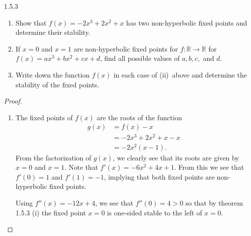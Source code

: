 \begin{problem}{1.5.3}
  \begin{enumerate}
    \item Show that $f(x) = -2x^3 + 2x^2 +x$ has two non-hyperbolic fixed points and determine their stability.
    \item If $x=0$ and $x=1$ are non-hyperbolic fixed points for $f:\mathbb{R}\to\mathbb{R}$ for $f(x) = ax^3 + bx^2 + cx + d$,
      find all possible values of $a, b, c,$ and $d$.
    \item Write down the function $f(x)$ in each case of (ii)\ above and determine the stability of the fixed points.
  \end{enumerate}
\end{problem}

\begin{proof}
  \begin{enumerate}
    \item The fixed points of $f(x)$ are the roots of the function
      \begin{align*}
        g(x) &= f(x) - x \\
        &= -2x^3 + 2x^2 + x - x \\
        &= -2x^2(x-1).
      \end{align*}
      From the factorization of $g(x)$, we clearly see that its roots are given by $x=0$ and $x=1$.
      Note that $f'(x) = -6x^2 + 4x + 1$. From this we see that $f'(0) = 1$ and $f'(1)=-1$, implying that both
      fixed points are non-hyperbolic fixed points.

      Using $f''(x) = -12x + 4$, we see that $f''(0) = 4 > 0$ so that by theorem 1.5.3 (i) the fixed point $x=0$ is one-sided stable to the left of $x =0$.


\end{enumerate}
\end{proof}
